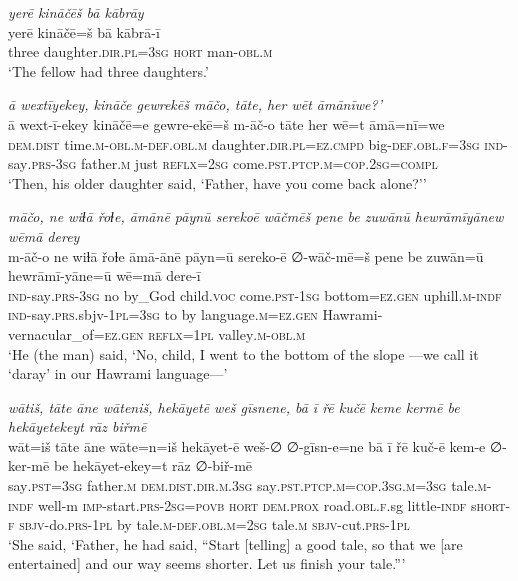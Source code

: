 \ea \label{ŽH.21}
\textit{yerē kināčēš bā kābrāy} \\ 
\gll yerē kināčē=š bā kābrā-ī \\ 
 three daughter\textsc{.dir}\textsc{.pl}\textsc{=3sg} \textsc{hort} man\textsc{-obl}\textsc{.m} \\ 
\glt `The fellow had three daughters.'
\z 
 
\ea \label{ŽH.22}
\textit{ā wextīyekey, kināče gewrekēš māčo, tāte, her wēt āmānīwe?’} \\ 
\gll ā wext-ī-ekey kināčē=e gewre-ekē=š m-āč-o tāte her wē=t āmā=nī=we \\ 
 \textsc{dem.dist} time\textsc{.m}\textsc{-obl}\textsc{.m}\textsc{-def}\textsc{.obl}\textsc{.m} daughter\textsc{.dir}\textsc{.pl}\textsc{=ez}\textsc{.cmpd} big\textsc{-def}\textsc{.obl}\textsc{\textsc{.f}}\textsc{=3sg} \textsc{ind-}say\textsc{.prs}\textsc{-3sg} father\textsc{.m} just \textsc{reflx}\textsc{=\textsc{2sg}} come\textsc{.pst}\textsc{.ptcp}\textsc{.m}\textsc{=cop}\textsc{.\textsc{2sg}}\textsc{=compl} \\ 
\glt `Then, his older daughter said, ‘Father, have you come back alone?’'
\z 
 
\ea \label{ŽH.23}
\textit{māčo, ne wiɫā řoɫe, āmānē pāynū serekoē wāčmēš pene be zuwānū hewrāmīyānew wēmā derey} \\ 
\gll m-āč-o ne wiɫā řoɫe āmā-ānē pāyn=ū sereko-ē ∅-wāč-mē=š pene be zuwān=ū hewrāmī-yāne=ū wē=mā dere-ī \\ 
 \textsc{ind-}say\textsc{.prs}\textsc{-3sg} no by\_God child.\textsc{voc} come\textsc{.pst}\textsc{-1sg} bottom\textsc{=ez}\textsc{.gen} uphill\textsc{.m}\textsc{-indf} \textsc{ind-}say\textsc{.prs}.sbjv\textsc{-1pl}\textsc{=3sg} to by language\textsc{.m}\textsc{=ez}\textsc{.gen} Hawrami-vernacular\_of\textsc{=ez}\textsc{.gen} \textsc{reflx}\textsc{=1pl} valley\textsc{.m}\textsc{-obl}\textsc{.m} \\ 
\glt `He (the man) said, ‘No, child, I went to the bottom of the slope —we call it ‘daray’ in our Hawrami language—'
\z 
 
\ea \label{ŽH.27}
\textit{wātiš, tāte āne wāteniš, hekāyetē weš gīsnene, bā ī řē kučē keme kermē be hekāyetekeyt rāz biřmē} \\ 
\gll wāt=iš tāte āne wāte=n=iš hekāyet-ē weš-∅ ∅-gīsn-e=ne bā ī řē kuč-ē kem-e ∅-ker-mē be hekāyet-ekey=t rāz ∅-biř-mē \\ 
 say\textsc{.pst}\textsc{=3sg} father\textsc{.m} \textsc{dem.dist}\textsc{.dir}\textsc{.m}\textsc{.3sg} say\textsc{.pst}\textsc{.ptcp}\textsc{.m}\textsc{=cop}\textsc{.3sg}\textsc{.m}\textsc{=3sg} tale\textsc{.m}\textsc{-indf} well-m \textsc{imp-}start\textsc{.prs}-\textsc{2sg}\textsc{=\textsc{povb}} \textsc{hort} \textsc{dem.prox} road\textsc{.obl}\textsc{\textsc{.f}}.sg little\textsc{-indf} s\textsc{hort}\textsc{-f} \textsc{sbjv-}do\textsc{.prs}\textsc{-1pl} by tale\textsc{.m}\textsc{-def}\textsc{.obl}\textsc{.m}\textsc{=\textsc{2sg}} tale\textsc{.m} \textsc{sbjv-}cut\textsc{.prs}\textsc{-1pl} \\ 
\glt `She said, ‘Father, he had said, “Start [telling] a good tale, so that we [are entertained] and our way seems shorter. Let us finish your tale.”'
\z 
 
